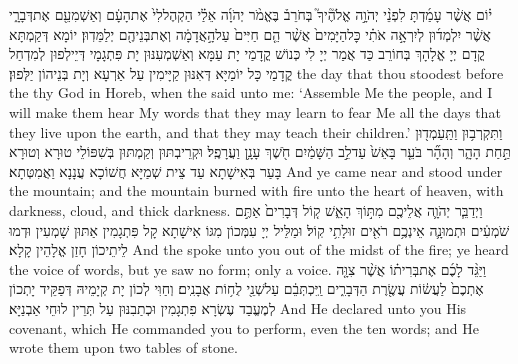 {י֗וֹם אֲשֶׁ֨ר עָמַ֜דְתָּ לִפְנֵ֨י יְהֹוָ֣ה אֱלֹהֶ֘יךָ֮ בְּחֹרֵב֒ בֶּאֱמֹ֨ר יְהֹוָ֜ה אֵלַ֗י הַקְהֶל\maqqaf לִי֙ אֶת\maqqaf הָעָ֔ם וְאַשְׁמִעֵ֖ם אֶת\maqqaf דְּבָרָ֑י אֲשֶׁ֨ר יִלְמְד֜וּן לְיִרְאָ֣ה אֹתִ֗י כׇּל\maqqaf הַיָּמִים֙ אֲשֶׁ֨ר הֵ֤ם חַיִּים֙ עַל\maqqaf הָ֣אֲדָמָ֔ה וְאֶת\maqqaf בְּנֵיהֶ֖ם יְלַמֵּדֽוּן׃}
{יוֹמָא דְּקַמְתָּא קֳדָם יְיָ אֱלָהָךְ בְּחוֹרֵב כַּד אֲמַר יְיָ לִי כְּנוֹשׁ קֳדָמַי יָת עַמָּא וְאַשְׁמְעִנּוּן יָת פִּתְגָמָי דְּיֵילְפוּן לְמִדְחַל קֳדָמַי כָּל יוֹמַיָּא דְּאִנּוּן קַיָּימִין עַל אַרְעָא וְיָת בְּנֵיהוֹן יַלְּפוּן׃}
{the day that thou stoodest before the \lord\space thy God in Horeb, when the \lord\space said unto me: ‘Assemble Me the people, and I will make them hear My words that they may learn to fear Me all the days that they live upon the earth, and that they may teach their children.’}{}
{וַתִּקְרְב֥וּן וַתַּֽעַמְד֖וּן תַּ֣חַת הָהָ֑ר וְהָהָ֞ר בֹּעֵ֤ר בָּאֵשׁ֙ עַד\maqqaf לֵ֣ב הַשָּׁמַ֔יִם חֹ֖שֶׁךְ עָנָ֥ן וַעֲרָפֶֽל׃}
{וּקְרֵיבְתּוּן וְקַמְתּוּן בְּשִׁפּוֹלֵי טוּרָא וְטוּרָא בָּעַר בְּאִישָׁתָא עַד צֵית שְׁמַיָּא חֲשׁוֹכָא עֲנָנָא וַאֲמִטְּתָא׃}
{And ye came near and stood under the mountain; and the mountain burned with fire unto the heart of heaven, with darkness, cloud, and thick darkness.}{}
{וַיְדַבֵּ֧ר יְהֹוָ֛ה אֲלֵיכֶ֖ם מִתּ֣וֹךְ הָאֵ֑שׁ ק֤וֹל דְּבָרִים֙ אַתֶּ֣ם שֹׁמְעִ֔ים וּתְמוּנָ֛ה אֵינְכֶ֥ם רֹאִ֖ים זוּלָתִ֥י קֽוֹל׃}
{וּמַלֵּיל יְיָ עִמְּכוֹן מִגּוֹ אִישָׁתָא קָל פִּתְגָמִין אַתּוּן שָׁמְעִין וּדְמוּ לֵיתֵיכוֹן חָזַן אֱלָהֵין קָלָא׃}
{And the \lord\space spoke unto you out of the midst of the fire; ye heard the voice of words, but ye saw no form; only a voice.}{}
{וַיַּגֵּ֨ד לָכֶ֜ם אֶת\maqqaf בְּרִית֗וֹ אֲשֶׁ֨ר צִוָּ֤ה אֶתְכֶם֙ לַעֲשׂ֔וֹת עֲשֶׂ֖רֶת הַדְּבָרִ֑ים וַֽיִּכְתְּבֵ֔ם עַל\maqqaf שְׁנֵ֖י לֻח֥וֹת אֲבָנִֽים׃}
{וְחַוִּי לְכוֹן יָת קְיָמֵיהּ דְּפַקֵּיד יָתְכוֹן לְמֶעֱבַד עֶשְׂרָא פִתְגָמִין וּכְתַבִנּוּן עַל תְּרֵין לוּחֵי אַבְנַיָּא׃}
{And He declared unto you His covenant, which He commanded you to perform, even the ten words; and He wrote them upon two tables of stone.}{}
